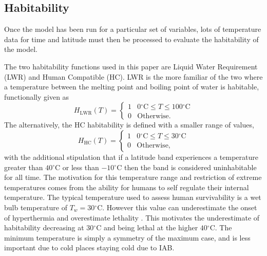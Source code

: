 \documentclass[12pt, onecolumn]{revtex4-2}    %
\newcommand{\degreesC}{\ensuremath{^{\circ}\text{C}}}
\begin{document}

\subsection{Habitability} \label{ssec:Habitability_intro}
Once the model has been run for a particular set of variables, lots of temperature data for time and latitude must then be processed to evaluate the habitability of the model.

The two habitability functions used in this paper are Liquid Water Requirement (LWR) and Human Compatible (HC).
LWR is the more familiar of the two where a temperature between the melting point and boiling point of water is habitable, functionally given as
\begin{equation}
  H_\text{LWR}(T) =
  \begin{cases}
    1 & 0\degreesC \le T \le 100\degreesC \\
    0 & \text{Otherwise.}
  \end{cases}
  \label{eq:H_LWR}
\end{equation}
The alternatively, the HC habitability is defined with a smaller range of values,
\begin{equation}
  H_\text{HC}(T) =
  \begin{cases}
    1 & 0\degreesC \le T \le 30\degreesC \\
    0 & \text{Otherwise,}
  \end{cases}
  \label{eq:H_HC}
\end{equation}
with the additional stipulation that if a latitude band experiences a temperature greater than $40\degreesC$ or less than $-10\degreesC$ then the band is considered uninhabitable for all time.
The motivation for this temperature range and restriction of extreme temperatures comes from the ability for humans to self regulate their internal temperature.
The typical temperature used to assess human survivability is a wet bulb temperature of $T_w = 30\degreesC$.
However this value can underestimate the onset of hyperthermia and overestimate lethality \cite{LuRomps2023}.
This motivates the underestimate of habitability decreasing at $30\degreesC$ and being lethal at the higher $40\degreesC$.
The minimum temperature is simply a symmetry of the maximum case, and is less important due to cold places staying cold due to IAB.
\end{document}
